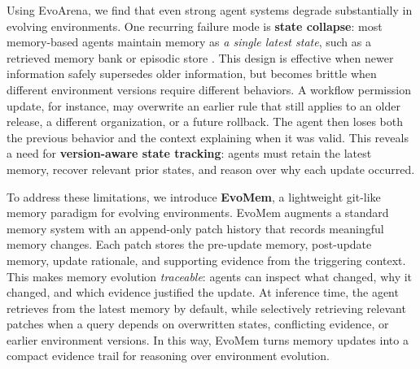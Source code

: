 \documentclass{llmxive}
\begin{document}
Using EvoArena, we find that even strong agent systems degrade substantially in evolving environments. One recurring failure mode is \textbf{state collapse}: most memory-based agents maintain memory as \textit{a single latest state}, such as a retrieved memory bank or episodic store \cite{ mem0,xu2025amem, memento-s}. This design is effective when newer information safely supersedes older information, but becomes brittle when different environment versions require different behaviors. A workflow permission update, for instance, may overwrite an earlier rule that still applies to an older release, a different organization, or a future rollback. The agent then loses both the previous behavior and the context explaining when it was valid. This reveals a need for \textbf{version-aware state tracking}: agents must retain the latest memory, recover relevant prior states, and reason over why each update occurred.




To address these limitations, we introduce \textbf{EvoMem}, a lightweight git-like memory paradigm for evolving environments. EvoMem augments a standard memory system with an append-only patch history that records meaningful memory changes. Each patch stores the pre-update memory, post-update memory, update rationale, and supporting evidence from the triggering context. This makes memory evolution \emph{traceable}: agents can inspect what changed, why it changed, and which evidence justified the update. At inference time, the agent retrieves from the latest memory by default, while selectively retrieving relevant patches when a query depends on overwritten states, conflicting evidence, or earlier environment versions. In this way, EvoMem turns memory updates into a compact evidence trail for reasoning over environment evolution.
\end{document}
